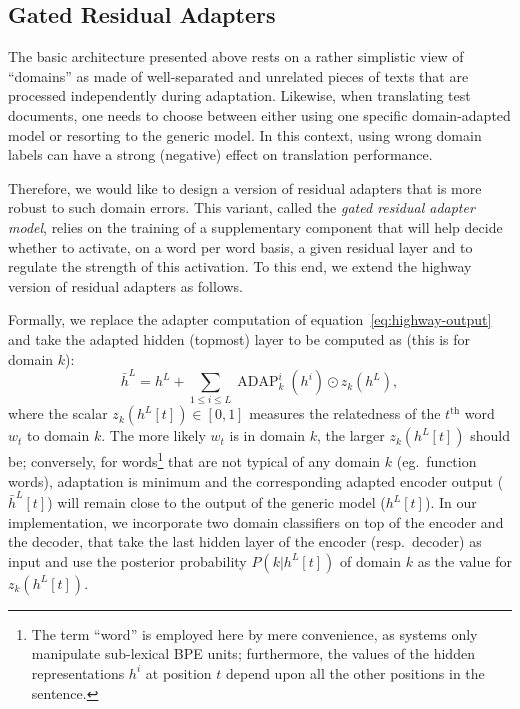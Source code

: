 \documentclass[11pt,a4paper]{article}
\newcommand{\fyDone}[1]{\done[FY]\Todo[FY:]{\textcolor{orange}{#1}}}
\newcommand{\mpDone}[1]{\done[MP]\Todo[MP:]{\textcolor{green}{#1}}}
\begin{document}
\subsection{Gated Residual Adapters \label{ssec:gate}}
\mpDone{Formalizing problem, network design, training algorithm}
The basic architecture presented above rests on a rather simplistic view of ``domains'' as made of well-separated and unrelated pieces of texts that are processed independently during adaptation. Likewise, when translating test documents, one needs to choose between either using one specific domain-adapted model or resorting to the generic model. In this context, using wrong domain labels can have a strong (negative) effect on translation performance. 

Therefore, we would like to design a version of residual adapters that is more robust to such domain errors. This variant, called the \emph{gated residual adapter model}, relies on the training of a supplementary component that will help decide whether to activate, on a word per word basis, a given residual layer and to regulate the strength of this activation. To this end, we extend the highway version of residual adapters as follows.
\fyDone{Consistency of notations wrt section 2.1}

Formally, we replace the adapter computation of equation~\eqref{eq:highway-output} and take the adapted hidden (topmost) layer to be computed as (this is for domain $k$):
\begin{equation}
  \bar{h}^L = h^L + \displaystyle{\mathop{\sum}_{1 \leq i \leq L} \operatorname{ADAP}_k^i(h^i) \odot{} z_k(h^L)}, \label{eq:gated-output}
\end{equation}
where the scalar $z_k(h^L[t]) \in [0,1]$ measures the relatedness of the $t^{\text{th}}$ word $w_t$ to domain $k$. The more likely $w_t$ is in domain $k$, the larger $z_k(h^L[t])$ should be; conversely, for words\footnote{The term ``word'' is employed here by mere convenience, as systems only manipulate sub-lexical BPE units; furthermore, the values of the hidden representations $h^{i}$ at position $t$ depend upon all the other positions in the sentence.} that are not typical of any domain $k$ (eg.\ function words),  adaptation is minimum and the corresponding adapted encoder output ($\bar{h}^L[t]$) will remain close to the output of the generic model ($h^L[t]$). In our implementation, we incorporate two domain classifiers on top of the encoder and the decoder, that take the last hidden layer of the encoder (resp.\ decoder) as input and use the posterior probability $P(k|h^L[t])$ of domain $k$ as the value for $z_k(h^L[t])$.
\end{document}
